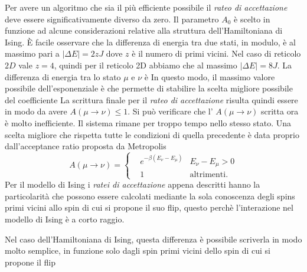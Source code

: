 \documentclass[a4paper,12pt]{article}
\begin{document}
Per avere un algoritmo che sia il più efficiente possibile il \emph{rateo di accettazione} deve essere significativamente diverso da zero. Il parametro $A_0$ è scelto in funzione ad alcune considerazioni relative alla struttura dell'Hamiltoniana di Ising. \`E facile osservare che la differenza di energia tra due stati, in modulo, \`e al massimo pari a $|\Delta E|=2zJ$ dove $z$ è il numero di primi vicini. Nel caso di reticolo $2D$ vale $z=4$, quindi per il reticolo 2D abbiamo che al massimo $|\Delta E|= 8J$. La differenza di energia tra lo stato $\mu$ e $\nu$ è
In questo modo, il massimo valore possibile dell'esponenziale \`e
che permette di stabilire la scelta migliore possibile del coefficiente
La scrittura finale per il \emph{rateo di accettazione} risulta quindi essere
in modo da avere $A(\mu\to\nu) \leq 1$.
Si può verificare che l' $A(\mu\to\nu)$ scritta ora è molto inefficiente. Il sistema rimane per troppo tempo nello stesso stato. Una scelta migliore che rispetta tutte le condizioni di quella precedente è data proprio dall'acceptance ratio proposta da Metropolis
\begin{equation} 
A(\mu\to\nu)=\left\{
        \begin{aligned}
                \label{acc2:ratio}
                &e^{-\beta(E_\nu-E_\mu)} &E_\nu-E_\mu > 0 \\
                &1 &\text{altrimenti.}
        \end{aligned}
        \right.
\end{equation}
Per il modello di Ising i \emph{ratei di accettazione} appena descritti hanno la particolarit\`a che possono essere calcolati mediante la sola conoscenza degli spins primi vicini allo spin di cui si propone il suo flip, questo perchè l'interazione nel modello di Ising  è a corto raggio. 

Nel caso dell'Hamiltoniana di Ising, questa differenza è possibile scriverla in modo molto semplice, in funzione solo dagli spin primi vicini dello spin di cui si propone il flip
\end{document}
